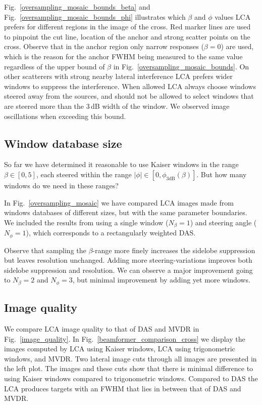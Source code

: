 \documentclass[10pt,journal,draftclsnofoot,onecolumn]{IEEEtran}
\newcommand\Fig[1]{Fig.~\ref{#1}}
\newcommand\1{\vec 1}
\begin{document}
\Fig{oversampling_mosaic_bounds_beta} and \Fig{oversampling_mosaic_bounds_phi} illustrates which $\beta$ and $\phi$ values LCA prefers for different regions in the image of the cross. Red marker lines are used to pinpoint the cut line, location of the anchor and strong scatter points on the cross. Observe that in the anchor region only narrow responses ($\beta=0$) are used, which is the reason for the anchor FWHM being measured to the same value regardless of the upper bound of $\beta$ in \Fig{oversampling_mosaic_bounds}. On other scatterers with strong nearby lateral interference LCA prefers wider windows to suppress the interference. When allowed LCA always choose windows steered away from the sources, and should not be allowed to select windows that are steered more than the 3\,dB width of the window. We observed image oscillations when exceeding this bound. 


\subsection{Window database size}\label{sec:results_database_size}

So far we have determined it reasonable to use Kaiser windows in the range $\beta\in[0,5]$, each steered within the range $|\phi|\in[0,\phi_\mathrm{3dB}(\beta)]$. But how many windows do we need in these ranges?

In \Fig{oversampling_mosaic} we have compared LCA images made from windows databases of different sizes, but with the same parameter boundaries. We included the results from using a single window ($N_\beta=1$) and steering angle ($N_\phi=1$), which corresponds to a rectangularly weighted DAS.

Observe that sampling the $\beta$-range more finely increases the sidelobe suppression but leaves resolution unchanged. Adding more steering-variations improves both sidelobe suppression and resolution. We can observe a major improvement going to $N_\beta=2$ and $N_\phi=3$, but minimal improvement by adding yet more windows.


\subsection{Image quality}\label{sec:results_image_quality}

We compare LCA image quality to that of DAS and MVDR in \Fig{image_quality}. In \Fig{beamformer_comparison_cross} we display the images computed by LCA using Kaiser windows, LCA using trigonometric windows, and MVDR. Two lateral image cuts through all images are presented in the left plot. The images and these cuts show that there is minimal difference to using Kaiser windows compared to trigonometric windows. Compared to DAS the LCA produces targets with an FWHM that lies in between that of DAS and MVDR.
\end{document}
